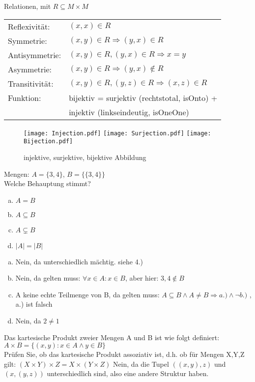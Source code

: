 \begin{card}
	Relationen, mit $R \subseteq M \times M$\\
	\begin{tabular}{ll}
		Reflexivität:& $(x, x) \in R $\\
		Symmetrie:&	$(x, y) \in R \Rightarrow (y, x) \in R$\\
		Antisymmetrie:& $(x, y) \in R, (y, x) \in R \Rightarrow x=y$\\
		Asymmetrie:& $(x, y) \in R \Rightarrow (y, x) \notin R$\\
		Transitivität:& $(x, y) \in R, (y, z) \in R \Rightarrow (x, z) \in R$\\
		Funktion: & bijektiv = surjektiv (rechtstotal, isOnto) +\\
	     	      & injektiv (linkseindeutig, isOneOne)
		\end{tabular}
		\begin{figure}[h]
		\centering
		\texttt{[image: Injection.pdf]}
		\texttt{[image: Surjection.pdf]}
		\texttt{[image: Bijection.pdf]}
		\caption{injektive, surjektive, bijektive Abbildung}
		\end{figure}
\end{card}

\begin{card}
	Mengen: $A = \{3, 4\}$, $B = \{\{3, 4\}\}$\\Welche Behauptung stimmt?
	\begin{enumerate}[a)]
	\item $A = B$
	\item $A \subseteq B$
	\item $A \subsetneq B$
	\item $|A| = |B|$
	\end{enumerate}
	\hr
	\begin{enumerate}[a)]
	\item Nein, da unterschiedlich mächtig. siehe 4.)
	\item Nein, da gelten muss: $\forall x \in A: x \in B$, aber hier: $3,4 \notin B$
	\item A keine echte Teilmenge von B, da gelten muss: $A \subseteq B \land A \neq B \Rightarrow a.) \land \lnot b.)$ , a.) ist falsch
	\item Nein, da $2 \neq 1$
	\end{enumerate}
\end{card}

\begin{card}
	Das kartesische Produkt zweier Mengen A und B ist wie folgt definiert:
	$A \times B = \{(x,y):x	\in	A \land	y \in B\}$\\
	Prüfen Sie, ob das kartesische Produkt assoziativ ist, d.h. ob für Mengen X,Y,Z gilt:
	$(X	\times Y)\times Z=X \times(Y \times Z)$
	\hr
	Nein, da die Tupel $((x,y),z)$ und $(x,(y,z))$ unterschiedlich sind, also eine andere Struktur haben.
\end{card}

